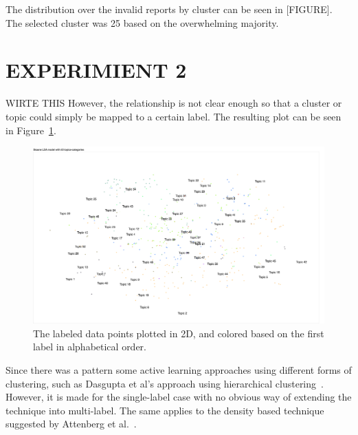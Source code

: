 The distribution over the invalid reports by cluster can be seen in [FIGURE].
The selected cluster was 25 based on the overwhelming majority.

\section{EXPERIMIENT 2}

WIRTE THIS
However, the relationship is not clear enough so that a cluster or topic could simply be mapped to a certain label.
The resulting plot can be seen in Figure~\ref{fig:categories-lda-50}.

\begin{figure}
    \centering
    \includegraphics[scale=0.35, angle=270]{figures/categories-lda-50.png}
    \caption{The labeled data points plotted in 2D, and colored based on the first label in alphabetical order.}
    \label{fig:categories-lda-50}
\end{figure}

Since there was a pattern some active learning approaches using different forms of clustering, such as Dasgupta et al\@'s approach using hierarchical clustering~\cite{dasgupta2008hierarchical}.
However, it is made for the single-label case with no obvious way of extending the technique into multi-label.
The same applies to the density based technique suggested by Attenberg et al\@.~\cite{attenberg2013class}.